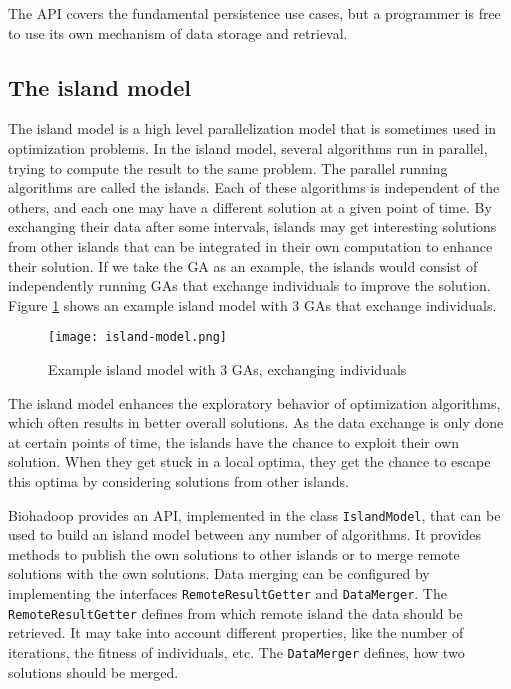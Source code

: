 The API covers the fundamental persistence use cases, but a programmer is free to use its own mechanism of data storage and retrieval.

\subsection{The island model}
\label{chap:impl:island-model}
The island model is a high level parallelization model that is sometimes used in optimization problems. In the island model, several algorithms run in parallel, trying to compute the result to the same problem. The parallel running algorithms are called the islands. Each of these algorithms is independent of the others, and each one may have a different solution at a given point of time. By exchanging their data after some intervals, islands may get interesting solutions from other islands that can be integrated in their own computation to enhance their solution. If we take the GA as an example, the islands would consist of independently running GAs that exchange individuals to improve the solution. Figure \ref{fig:island-model} shows an example island model with 3 GAs that exchange individuals.

\begin{figure}[ht!]
  \centering
  \texttt{[image: island-model.png]}
  \caption{Example island model with 3 GAs, exchanging individuals}
  \label{fig:island-model}
\end{figure}

The island model enhances the exploratory behavior of optimization algorithms, which often results in better overall solutions. As the data exchange is only done at certain points of time, the islands have the chance to exploit their own solution. When they get stuck in a local optima, they get the chance to escape this optima by considering solutions from other islands.

Biohadoop provides an API, implemented in the class \texttt{IslandModel}, that can be used to build an island model between any number of algorithms. It provides methods to publish the own solutions to other islands or to merge remote solutions with the own solutions. Data merging can be configured by implementing the interfaces \texttt{RemoteResultGetter} and \texttt{DataMerger}. The \texttt{RemoteResultGetter} defines from which remote island the data should be retrieved. It may take into account different properties, like the number of iterations, the fitness of individuals, etc. The \texttt{DataMerger} defines, how two solutions should be merged.

